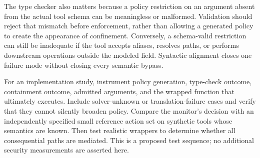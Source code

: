 The type checker also matters because a policy restriction on an argument absent from the actual tool schema can be meaningless or malformed. Validation should reject that mismatch before enforcement, rather than allowing a generated policy to create the appearance of confinement. Conversely, a schema-valid restriction can still be inadequate if the tool accepts aliases, resolves paths, or performs downstream operations outside the modeled field. Syntactic alignment closes one failure mode without closing every semantic bypass.

For an implementation study, instrument policy generation, type-check outcome, containment outcome, admitted arguments, and the wrapped function that ultimately executes. Include solver-unknown or translation-failure cases and verify that they cannot silently broaden policy. Compare the monitor's decision with an independently specified small reference action set on synthetic tools whose semantics are known. Then test realistic wrappers to determine whether all consequential paths are mediated. This is a proposed test sequence; no additional security measurements are asserted here.

